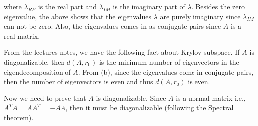 \begin{enumerate}
where $\lambda_{RE}$ is the real part and $\lambda_{IM}$ is the imaginary part of $\lambda$.  Besides the zero eigenvalue, the above shows that the eigenvalues $\lambda$ are purely imaginary since $\lambda_{IM}$ can not be zero. Also, the eigenvalues comes in as conjugate pairs since $A$ is a real matrix. 

From the lectures notes, we have the following fact about Krylov subspace. If $A$ is diagonalizable, then $d(A,r_{0})$ is the minimum number of eigenvectors in the eigendecomposition of $A$. From (b), since the eigenvalues come in conjugate pairs, then the number of eigenvectors is even and thus $d(A,r_{0})$ is even. 

Now we need to prove that $A$ is diagonalizable. Since $A$ is a normal matrix i.e., $A^{T}A = AA^{T} = -AA $, then it must be diagonalizable (following the Spectral theorem). 





\end{enumerate}